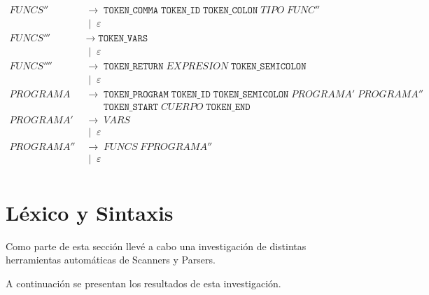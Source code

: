 \documentclass[12pt, letterpaper]{article}
\theoremstyle{definition}
\newcommand{\produce}{\;\longrightarrow\;}
\newcommand{\OR}{\;\mid\;}
\begin{document}
\small{
    \begin{align}
    \mathit{FUNCS''} &\produce \texttt{TOKEN\_COMMA}\; \texttt{TOKEN\_ID}\;\texttt{TOKEN\_COLON}\;\mathit{TIPO}\; \mathit{FUNC''}\;  \\
                   & \OR \varepsilon \nonumber\\[3pt]
    \mathit{FUNCS'''} &\produce \texttt{TOKEN\_VARS}\;  \\
                   & \OR \varepsilon \nonumber\\[3pt]
    \mathit{FUNCS''''} &\produce \texttt{TOKEN\_RETURN}\; \mathit{EXPRESION}\;\texttt{TOKEN\_SEMICOLON}\; \\
                    & \OR \varepsilon \nonumber\\[3pt]
    \mathit{PROGRAMA} &\produce \texttt{TOKEN\_PROGRAM}\;\texttt{TOKEN\_ID}\;%
                                 \texttt{TOKEN\_SEMICOLON}\;\mathit{PROGRAMA'}\;\mathit{PROGRAMA''}\   \\
                      &\phantom{{}\produce{}}%
                         \texttt{TOKEN\_START}\;\mathit{CUERPO}\;\texttt{TOKEN\_END} \nonumber\\[3pt]
    \mathit{PROGRAMA'} &\produce \mathit{VARS} \\
                      &\OR \varepsilon  \nonumber\\[3pt]
    \mathit{PROGRAMA''} &\produce \mathit{FUNCS}\; \mathit{FPROGRAMA''}  \\
                      &\OR \varepsilon  \nonumber\\[3pt]\nonumber
    \end{align}
}

\section{Léxico y Sintaxis}
Como parte de esta sección llevé a cabo una investigación de distintas herramientas automáticas de Scanners y Parsers.

A continuación se presentan los resultados de esta investigación.
\end{document}
